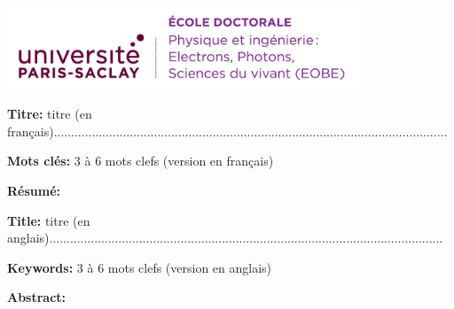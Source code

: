 \documentclass[12pt,a4paper]{book}
\begin{document}
    \ifthispageodd{\newpage\thispagestyle{empty}\null\newpage}{}
    \thispagestyle{empty}
    \selectfont

    \lhead{}
    \rhead{}
    \rfoot{}
    \cfoot{}
    \lfoot{}

    \noindent
    \includegraphics[height=2.45cm]{static/logos/EOBE}
    \vspace{1cm}
    \selectfont

    \small

    \begin{mdframed}[linecolor=Prune,linewidth=1]

        \textbf{Titre:} titre (en français)..................................................................................................................

        \noindent \textbf{Mots clés:} 3 à 6 mots clefs (version en français)

        \vspace{-.5cm}
        \begin{multicols}{2}
            \noindent \textbf{Résumé:}\lipsum[1-2]
        \end{multicols}

    \end{mdframed}

    \vspace{8mm}

    \begin{mdframed}[linecolor=Prune,linewidth=1]

        \textbf{Title:} titre (en anglais)..................................................................................................................

        \noindent \textbf{Keywords:} 3 à 6 mots clefs (version en anglais)

        \begin{multicols}{2}
            \noindent \textbf{Abstract:} \lipsum[1-2]
        \end{multicols}
    \end{mdframed}
\end{document}
